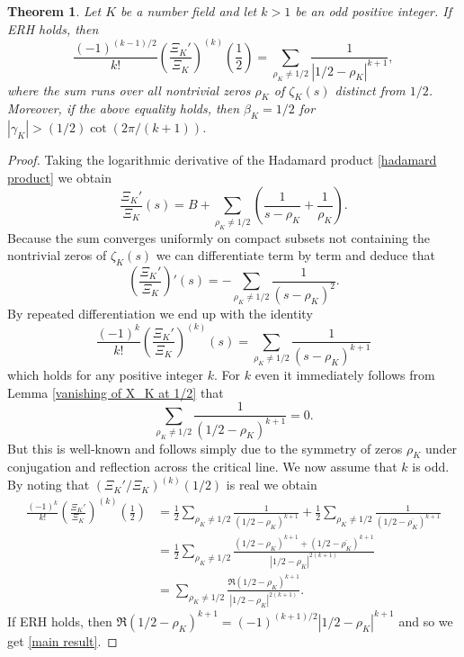 \documentclass[10pt,a4paper]{amsart}
\newtheorem{theorem}{Theorem}
\begin{document}
\begin{theorem}
Let $K$ be a number field and let $k > 1$ be an odd positive integer. If ERH holds, then 
\begin{equation} \label{main result}
\frac{(-1)^{(k - 1)/2}}{k!} \left( \frac{\Xi_K'}{\Xi_K} \right)^{(k)} \left(\frac{1}{2} \right) = \sum_{\rho_K \neq 1/2} \frac{1}{|1/2 - \rho_K|^{k + 1}},
\end{equation}
where the sum runs over all nontrivial zeros $\rho_K$ of $\zeta_K(s)$ distinct from $1/2$. Moreover, if the above equality holds, then $\beta_K = 1/2$ for $|\gamma_K| > (1/2)\cot (2 \pi/(k + 1))$.
\end{theorem}

\begin{proof}
Taking the logarithmic derivative of the Hadamard product \eqref{hadamard product} we obtain
\[
\frac{\Xi_K'}{\Xi_K}(s) = B + \sum_{\rho_K \neq 1/2} \left( \frac{1}{s - \rho_K} + \frac{1}{\rho_K} \right).
\]
Because the sum converges uniformly on compact subsets not containing the nontrivial zeros of $\zeta_K(s)$ we can differentiate term by term and deduce that
\[
\left( \frac{\Xi_K'}{\Xi_K} \right)'(s) = - \sum_{\rho_K \neq 1/2} \frac{1}{(s - \rho_K)^2}.
\]
By repeated differentiation we end up with the identity
\[
\frac{(-1)^k}{k!}\left( \frac{\Xi_K'}{\Xi_K} \right)^{(k)}(s) = \sum_{\rho_K \neq 1/2} \frac{1}{(s - \rho_K)^{k + 1}}
\]
which holds for any positive integer $k$. For $k$ even it immediately follows from Lemma \ref{vanishing of X_K at 1/2} that
\[
\sum_{\rho_K \neq 1/2} \frac{1}{(1/2 - \rho_K)^{k + 1}} = 0.
\]
But this is well-known and follows simply due to the symmetry of zeros $\rho_K$ under conjugation and reflection across the critical line. We now assume that $k$ is odd. By noting that $(\Xi_K'/\Xi_K)^{(k)} (1/2)$ is real we obtain
\begin{align*}
\frac{(-1)^k}{k!}\left( \frac{\Xi_K'}{\Xi_K} \right)^{(k)} \left( \frac{1}{2} \right) &= \frac{1}{2}\sum_{\rho_K \neq 1/2} \frac{1}{(1/2 - \rho_K)^{k + 1}} + \frac{1}{2} \sum_{\rho_K \neq 1/2} \frac{1}{(1/2 - \overline{\rho_K})^{k + 1}}  \\
&= \frac{1}{2} \sum_{\rho_K \neq 1/2} \frac{(1/2 - \rho_K)^{k + 1} + (1/2 - \overline{\rho_K})^{k + 1}}{|1/2 - \rho_K|^{2(k + 1)}} \\
&= \sum_{\rho_K \neq 1/2} \frac{\Re(1/2 - \rho_K)^{k + 1}}{|1/2 - \rho_K|^{2(k + 1)}}.
\end{align*}
If ERH holds, then $\Re(1/2 - \rho_K)^{k + 1} = (-1)^{(k + 1)/2} |1/2 - \rho_K|^{k + 1}$ and so we get \eqref{main result}.


\end{proof}
\end{document}
